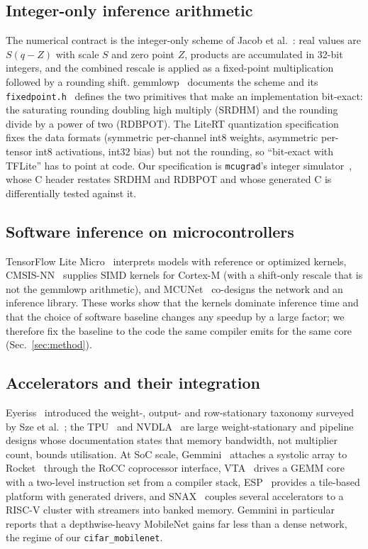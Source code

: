 \documentclass[journal]{IEEEtran}
\newcommand{\code}[1]{\texttt{#1}}
\begin{document}
\subsection{Integer-only inference arithmetic}
The numerical contract is the integer-only scheme of Jacob et al.~\cite{jacob2018quantization}: real values are $S(q-Z)$ with scale $S$ and zero point $Z$, products are accumulated in 32-bit integers, and the combined rescale is applied as a fixed-point multiplication followed by a rounding shift. gemmlowp~\cite{gemmlowp_quantization} documents the scheme and its \code{fixedpoint.h}~\cite{gemmlowp_fixedpoint} defines the two primitives that make an implementation bit-exact: the saturating rounding doubling high multiply (SRDHM) and the rounding divide by a power of two (RDBPOT). The LiteRT quantization specification~\cite{litert_quantspec} fixes the data formats (symmetric per-channel int8 weights, asymmetric per-tensor int8 activations, int32 bias) but not the rounding, so ``bit-exact with TFLite'' has to point at code. Our specification is \texttt{mcugrad}'s integer simulator~\cite{mcugrad_repo}, whose C header restates SRDHM and RDBPOT and whose generated C is differentially tested against it.

\subsection{Software inference on microcontrollers}
TensorFlow Lite Micro~\cite{david2021tflm} interprets models with reference or optimized kernels, CMSIS-NN~\cite{lai2018cmsisnn} supplies SIMD kernels for Cortex-M (with a shift-only rescale that is not the gemmlowp arithmetic), and MCUNet~\cite{lin2020mcunet} co-designs the network and an inference library. These works show that the kernels dominate inference time and that the choice of software baseline changes any speedup by a large factor; we therefore fix the baseline to the code the same compiler emits for the same core (Sec.~\ref{sec:method}).

\subsection{Accelerators and their integration}
Eyeriss~\cite{chen2016eyeriss,chen2017eyeriss} introduced the weight-, output- and row-stationary taxonomy surveyed by Sze et al.~\cite{sze2017efficient}; the TPU~\cite{jouppi2017tpu} and NVDLA~\cite{nvdla_hw} are large weight-stationary and pipeline designs whose documentation states that memory bandwidth, not multiplier count, bounds utilisation. At SoC scale, Gemmini~\cite{genc2021gemmini} attaches a systolic array to Rocket~\cite{asanovic2016rocket} through the RoCC coprocessor interface, VTA~\cite{moreau2018vta} drives a GEMM core with a two-level instruction set from a compiler stack, ESP~\cite{mantovani2020esp} provides a tile-based platform with generated drivers, and SNAX~\cite{antonio2025snax} couples several accelerators to a RISC-V cluster with streamers into banked memory. Gemmini in particular reports that a depthwise-heavy MobileNet gains far less than a dense network, the regime of our \texttt{cifar\_mobilenet}.
\end{document}
